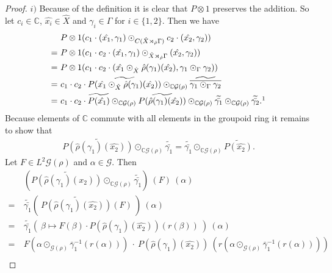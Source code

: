 \documentclass[12pt,a4paper]{scrartcl}
\theoremstyle{plain}
\theoremstyle{definition}
\numberwithin{equation}{section}
\newcommand{\C}{\mathbb{C}} %
\newcommand{\2}{\mathbb{Z} / 2 \mathbb{Z}}
\newcommand{\G}{\mathcal{G}}
\newcommand{\1}{\bar{1}}
\newcommand{\0}{\bar{0}}
\begin{document}
\begin{proof}
	$i)$ Because of the definition it is clear that $P \otimes 1$ preserves the addition. So let $c_i \in \C$, $\hat{x_i} \in \hat{X}$ and $\gamma_i \in \Gamma$ for $i \in \{1,2\}$. Then we have
	\begin{align*}
		 &~ P \otimes 1(c_1 \cdot (\hat{x_1}, \gamma_1) \odot_{C(\hat{X} \rtimes_{\hat{\rho}} \Gamma)} c_2 \cdot (\hat{x_2}, \gamma_2))  \\
		=&~ P \otimes 1(c_1 \cdot  c_2 \cdot (\hat{x_1}, \gamma_1) \odot_{\hat{X} \rtimes_{\hat{\rho}} \Gamma} (\hat{x_2}, \gamma_2)) \\
		=&~ P \otimes 1(c_1 \cdot  c_2 \cdot (\hat{x_1} \odot_{\hat{X}} \hat{\rho}(\gamma_1)(\hat{x_2}), \gamma_1 \odot_{\Gamma} \gamma_2)) \\
		=&~ c_1 \cdot  c_2 \cdot \widetilde{P(\hat{x_1} \odot_{\hat{X}} \hat{\rho}(\gamma_1)(\hat{x_2}))} \odot_{\C\G(\rho)} \widetilde{\overline{\gamma_1 \odot_{\Gamma} \gamma_2}} \\
		=&~ c_1 \cdot  c_2 \cdot \widetilde{P(\hat{x_1})} \odot_{\C\G(\rho)} \widetilde{P(\hat{\rho}(\gamma_1)(\hat{x_2}))} \odot_{\C\G(\rho)} \widetilde{\bar{\gamma_1}} \odot_{\C\G(\rho)} \widetilde{\bar{\gamma_2}}. \footnotemark
	\end{align*}
	Because elements of $\C$ commute with all elements in the groupoid ring it remains to show that 
	\begin{align*}
		\widetilde{P(\hat{\rho}(\gamma_1)(\hat{x_2}))} \odot_{\C\G(\rho)} \widetilde{\bar{\gamma_1}} = \widetilde{\bar{\gamma_1}} \odot_{\C\G(\rho)} \widetilde{P(\hat{x_2})}.
	\end{align*}
	Let $F \in L^2 \G(\rho)$ and $\alpha \in \G$. Then
	\begin{align*}
		 &~ (\widetilde{P(\hat{\rho}(\gamma_1)(\hat{x_2}))} \odot_{\C\G(\rho)} \widetilde{\bar{\gamma_1}})~(F)~(\alpha) \\
		=&~ \widetilde{\bar{\gamma_1}}(~\widetilde{P(\hat{\rho}(\gamma_1)(\hat{x_2}))}(F)~)~(\alpha) \\
		=&~ \widetilde{\bar{\gamma_1}}(~ \beta \mapsto F(\beta) \cdot P(\hat{\rho}(\gamma_1)(\hat{x_2}))(r(\beta))~) ~(\alpha) \\
		=&~ F(\alpha \odot_{\G (\rho)} \bar \gamma_1^{-1}(r(\alpha))) ~\cdot~ P(\hat{\rho}(\gamma_1)(\hat{x_2}))~(r(\alpha \odot_{\G (\rho)} \bar \gamma_1^{-1}(r(\alpha)))) \\

\end{align*}
\end{proof}
\end{document}
